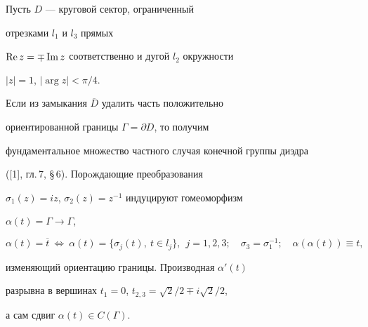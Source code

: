 \date{}




\pagestyle{plain} %







\maketitle


\label{begin}














Пусть $D$ --- круговой сектор, ограниченный


отрезками $l_1$ и $l_3$ прямых


$\operatorname{Re} z=\mp \operatorname{Im} z$ соответственно и дугой $l_2$ окружности


$|z|=1$, $|\arg z|< \pi/4$.


Если из замыкания $\overline{D}$ удалить часть положительно


ориентированной границы $\Gamma=\partial D$,  то получим


фундаментальное множество частного случая конечной группы диэдра


([1], гл.\,7, \S\,6). Порoждающие преобразования


$\sigma_{1}(z)=iz$, $\sigma_{2}(z)=z^{-1}$ индуцируют гомеоморфизм


$\alpha (t)=\Gamma \to \Gamma$,


$$


\alpha (t)=\overline{t}\ \Longleftrightarrow\ \alpha (t)=\{


\sigma_j(t),\ t\in l_j\},


\ \ j=1,2,3; \quad\sigma_3=\sigma_1^{-1} ;\quad\alpha


(\alpha (t))\equiv t ,


$$


изменяющий ориентацию границы. Производная $\alpha'(t)$


разрывна в вершинах $t_1=0$, $t_{2,3}=\sqrt{2}/2\mp i\sqrt{2}/2$,


а сам сдвиг $\alpha(t)\in C(\Gamma)$.





